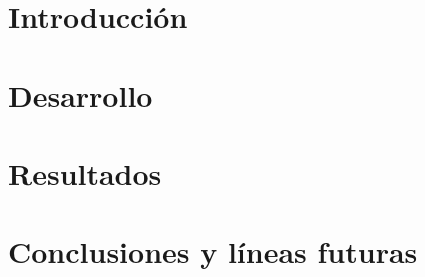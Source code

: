 \documentclass[spanish,a4paper,14pt,oneside]{extreport}
\begin{document}



\tableofcontents

\newpage{\pagestyle{empty}}

\listoffigures

\newpage{\pagestyle{empty}}

\listoftables

\newpage{\pagestyle{empty}}

\renewcommand{\thepage}{\arabic{page}}
\setcounter{page}{1}


\chapter{Introducción}
\label{chapter:intro}




\chapter{Desarrollo}
\label{chapter:dos}



\newpage{\pagestyle{empty}}
\thispagestyle{empty}

\chapter{Resultados}
\label{chapter:tres}



\newpage{\pagestyle{empty}}
\thispagestyle{empty}

\chapter{Conclusiones y líneas futuras}
\label{chapter:Conclusiones}
\end{document}
